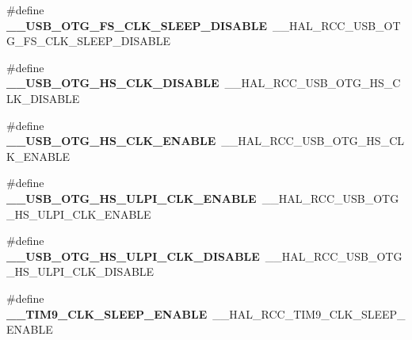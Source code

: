 \begin{DoxyCompactItemize}
\item 
\hypertarget{group___h_a_l___r_c_c___aliased_ga5e698c23794023e6a3bc1d636f969d29}{\#define {\bfseries \-\_\-\-\_\-\-U\-S\-B\-\_\-\-O\-T\-G\-\_\-\-F\-S\-\_\-\-C\-L\-K\-\_\-\-S\-L\-E\-E\-P\-\_\-\-D\-I\-S\-A\-B\-L\-E}~\-\_\-\-\_\-\-H\-A\-L\-\_\-\-R\-C\-C\-\_\-\-U\-S\-B\-\_\-\-O\-T\-G\-\_\-\-F\-S\-\_\-\-C\-L\-K\-\_\-\-S\-L\-E\-E\-P\-\_\-\-D\-I\-S\-A\-B\-L\-E}\label{group___h_a_l___r_c_c___aliased_ga5e698c23794023e6a3bc1d636f969d29}

\item 
\hypertarget{group___h_a_l___r_c_c___aliased_gaa06ceafbbae0701ae30f4f2208063ab2}{\#define {\bfseries \-\_\-\-\_\-\-U\-S\-B\-\_\-\-O\-T\-G\-\_\-\-H\-S\-\_\-\-C\-L\-K\-\_\-\-D\-I\-S\-A\-B\-L\-E}~\-\_\-\-\_\-\-H\-A\-L\-\_\-\-R\-C\-C\-\_\-\-U\-S\-B\-\_\-\-O\-T\-G\-\_\-\-H\-S\-\_\-\-C\-L\-K\-\_\-\-D\-I\-S\-A\-B\-L\-E}\label{group___h_a_l___r_c_c___aliased_gaa06ceafbbae0701ae30f4f2208063ab2}

\item 
\hypertarget{group___h_a_l___r_c_c___aliased_gabb3e2e415cffa49ad11304197a87c815}{\#define {\bfseries \-\_\-\-\_\-\-U\-S\-B\-\_\-\-O\-T\-G\-\_\-\-H\-S\-\_\-\-C\-L\-K\-\_\-\-E\-N\-A\-B\-L\-E}~\-\_\-\-\_\-\-H\-A\-L\-\_\-\-R\-C\-C\-\_\-\-U\-S\-B\-\_\-\-O\-T\-G\-\_\-\-H\-S\-\_\-\-C\-L\-K\-\_\-\-E\-N\-A\-B\-L\-E}\label{group___h_a_l___r_c_c___aliased_gabb3e2e415cffa49ad11304197a87c815}

\item 
\hypertarget{group___h_a_l___r_c_c___aliased_gacb7cf172f15526f73b2291f9440577d4}{\#define {\bfseries \-\_\-\-\_\-\-U\-S\-B\-\_\-\-O\-T\-G\-\_\-\-H\-S\-\_\-\-U\-L\-P\-I\-\_\-\-C\-L\-K\-\_\-\-E\-N\-A\-B\-L\-E}~\-\_\-\-\_\-\-H\-A\-L\-\_\-\-R\-C\-C\-\_\-\-U\-S\-B\-\_\-\-O\-T\-G\-\_\-\-H\-S\-\_\-\-U\-L\-P\-I\-\_\-\-C\-L\-K\-\_\-\-E\-N\-A\-B\-L\-E}\label{group___h_a_l___r_c_c___aliased_gacb7cf172f15526f73b2291f9440577d4}

\item 
\hypertarget{group___h_a_l___r_c_c___aliased_gabc6cd0dc76c5ed13a0e7cba823c13312}{\#define {\bfseries \-\_\-\-\_\-\-U\-S\-B\-\_\-\-O\-T\-G\-\_\-\-H\-S\-\_\-\-U\-L\-P\-I\-\_\-\-C\-L\-K\-\_\-\-D\-I\-S\-A\-B\-L\-E}~\-\_\-\-\_\-\-H\-A\-L\-\_\-\-R\-C\-C\-\_\-\-U\-S\-B\-\_\-\-O\-T\-G\-\_\-\-H\-S\-\_\-\-U\-L\-P\-I\-\_\-\-C\-L\-K\-\_\-\-D\-I\-S\-A\-B\-L\-E}\label{group___h_a_l___r_c_c___aliased_gabc6cd0dc76c5ed13a0e7cba823c13312}

\item 
\hypertarget{group___h_a_l___r_c_c___aliased_gac9bbf39b89a6473c844e17e11a3eab9f}{\#define {\bfseries \-\_\-\-\_\-\-T\-I\-M9\-\_\-\-C\-L\-K\-\_\-\-S\-L\-E\-E\-P\-\_\-\-E\-N\-A\-B\-L\-E}~\-\_\-\-\_\-\-H\-A\-L\-\_\-\-R\-C\-C\-\_\-\-T\-I\-M9\-\_\-\-C\-L\-K\-\_\-\-S\-L\-E\-E\-P\-\_\-\-E\-N\-A\-B\-L\-E}\label{group___h_a_l___r_c_c___aliased_gac9bbf39b89a6473c844e17e11a3eab9f}


\end{DoxyCompactItemize}
